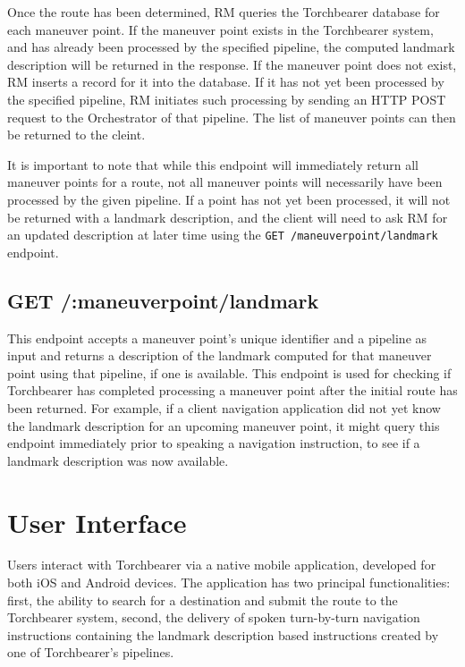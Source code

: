 Once the route has been determined, RM queries the Torchbearer database for each maneuver point. If the maneuver point exists in the Torchbearer system, and has already been processed by the specified pipeline, the computed landmark description will be returned in the response. If the maneuver point does not exist, RM inserts a record for it into the database. If it has not yet been processed by the specified pipeline, RM initiates such processing by sending an HTTP POST request to the Orchestrator of that pipeline. The list of maneuver points can then be returned to the cleint.

It is important to note that while this endpoint will immediately return all maneuver points for a route, not all maneuver points will necessarily have been processed by the given pipeline. If a point has not yet been processed, it will not be returned with a landmark description, and the client will need to ask RM for an updated description at later time using the \texttt{GET /maneuverpoint/landmark} endpoint.

\subsection{GET /:maneuverpoint/landmark}
This endpoint accepts a maneuver point’s unique identifier and a pipeline as input and returns a description of the landmark computed for that maneuver point using that pipeline, if one is available. This endpoint is used for checking if Torchbearer has completed processing a maneuver point after the initial route has been returned. For example, if a client navigation application did not yet know the landmark description for an upcoming maneuver point, it might query this endpoint immediately prior to speaking a navigation instruction, to see if a landmark description was now available.

\section{User Interface}\label{sec:arch:ui}
Users interact with Torchbearer via a native mobile application, developed for both iOS and Android devices. The application has two principal functionalities: first, the ability to search for a destination and submit the route to the Torchbearer system, second, the delivery of spoken turn-by-turn navigation instructions containing the landmark description based instructions created by one of Torchbearer’s pipelines.

